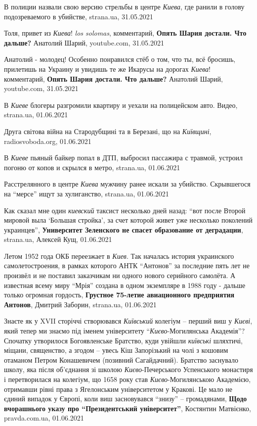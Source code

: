 В полиции назвали свою версию стрельбы в центре \emph{Киева}, где ранили в
голову подозреваемого в убийстве, strana.ua, 31.05.2021

Толя, привет из \emph{Киева}! \emph{los solomas},
комментарий, \textbf{Опять Шария достали. Что дальше?} Анатолий Шарий, youtube.com, 31.05.2021

Анатолий - молодец! Особенно понравился стёб о том, что ты, всё бросишь,
прилетишь на Украину и увидишь те же Икарусы на дорогах \emph{Киева}!
комментарий, \textbf{Опять Шария достали. Что дальше?} Анатолий Шарий, youtube.com, 31.05.2021

В \emph{Киеве} блогеры разгромили квартиру и уехали на полицейском авто. Видео,
strana.ua, 01.06.2021

Друга світова війна на Стародубщині та в Березані, що на \emph{Київщині},
radiosvoboda.org, 01.06.2021

В \emph{Киеве} пьяный байкер попал в ДТП, выбросил пассажира с травмой, устроил
погоню от копов и скрылся в метро, strana.ua, 01.06.2021

Расстрелянного в центре \emph{Киева} мужчину ранее искали за убийство. Скрывшегося на
\enquote{мерсе} ищут за хулиганство, strana.ua, 01.06.2021

Как сказал мне один \emph{киевский} таксист несколько дней назад: \enquote{вот
после Второй мировой выла \enquote{Большая стройка}, за счет которой живет уже
несколько поколений украинцев}, \textbf{Университет Зеленского не спасет
образование от деградации}, strana.ua, Алексей Кущ, 01.06.2021

Летом 1952 года ОКБ переезжает в \emph{Киев}. Так началась история украинского
самолетостроения, в рамках которого АНТК \enquote{Антонов} за последние пять
лет не произвёл и не поставил заказчикам ни одного нового серийного самолёта. А
известная всему миру \enquote{Мрія} создана в одном экземпляре в 1988 году -
дальше только огромная гордость, \textbf{Грустное 75-летие авиационного
предприятия Антонов}, Дмитрий Заборин, strana.ua, 01.06.2021

Знаєте як у XVII сторіччі створювався \emph{Київський} колегіум – перший виш у
\emph{Києві}, який тепер ми знаємо під іменем університету
\enquote{\emph{Києво}-Могилянська Академія}?  Спочатку утворилося Богоявленське
Братство, куди увійшли \emph{київські} шляхтичі, міщани, священство, а згодом –
увесь Кіш Запорізький на чолі з кошовим отаманом Петром Конашевичем (позивний
Сагайдачний). Братство заснувало школу, яка після об'єднання зі школою
\emph{Києво}-Печерського Успенського монастиря і перетворилася на колегіум, що
1658 року став \emph{Києво}-Могилянською Академією, отримавши рівні права з
Ягелонським університетом у Кракові. Це мало не єдиний випадок у Європі, коли
виш засновувався \enquote{знизу} – громадянами,
\textbf{Щодо вчорашнього указу про \enquote{Президентський університет}}, Костянтин Матвієнко, pravda.com.ua, 01.06.2021

